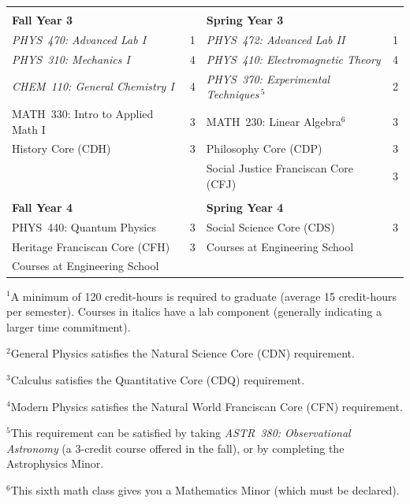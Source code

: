 \documentclass[12pt]{article}
\begin{document}
\begin{table}[h!]
\begin{center}
{\begin{tabular*}{0.9\textwidth}{@{\extracolsep{\fill}}lclc}
 & \\
{\Large \textbf{Fall Year 3}} & & {\Large \textbf{Spring Year 3}} & \\
\hline
{\em PHYS~470: Advanced Lab I} & 1 & {\em PHYS~472: Advanced Lab II}  & 1 \\
{\em PHYS~310: Mechanics I}         & 4 & {\em PHYS~410: Electromagnetic Theory}  & 4 \\
{\em CHEM~110: General Chemistry I} & 4 & {\em PHYS~370: Experimental Techniques}\,$^{5}$ & 2 \\
MATH~330: Intro to Applied Math I   & 3 & MATH~230: Linear Algebra$^{6}$    & 3 \\
History Core (CDH)                  & 3 & Philosophy Core (CDP)             & 3 \\
                                    &   & Social Justice Franciscan Core (CFJ) & 3 \\
 & \\
{\Large \textbf{Fall Year 4}} & & {\Large \textbf{Spring Year 4}} & \\
\hline
PHYS~440: Quantum Physics      & 3 & Social Science Core (CDS) & 3 \\
Heritage Franciscan Core (CFH) & 3 & Courses at Engineering School &  \\
Courses at Engineering School  &   &  & \\
\hline
\end{tabular*}
}
\end{center}
\end{table}

\vspace*{-4mm}
\hspace{0.1in}$^{1}$A minimum of 120 credit-hours is required to
graduate (average 15 credit-hours per semester).  \hspace*{0.42in}Courses in italics have a lab
component (generally indicating a larger time commitment). 

\hspace{0.1in}$^{2}$General Physics satisfies the Natural Science Core (CDN) requirement.

\hspace{0.1in}$^{3}$Calculus satisfies the Quantitative Core (CDQ) requirement.

\hspace{0.1in}$^{4}$Modern Physics satisfies the Natural World Franciscan Core
(CFN) requirement.

\hspace{0.1in}$^{5}$This requirement can be satisfied by taking {\em ASTR~380:
  Observational Astronomy} (a 3-credit \hspace*{0.42in}course offered in the
fall), or by completing the Astrophysics Minor.

\hspace{0.1in}$^{6}$This sixth math class gives you a Mathematics Minor (which
must be declared).
\end{document}
